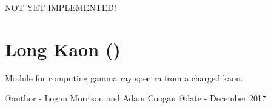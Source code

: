\documentclass[letterpaper,10pt,english]{sphinxmanual}
\begin{document}

\begin{fulllineitems}
\label{\detokenize{modules:hazma.charged_kaon.fsr}}
NOT YET IMPLEMENTED!

\end{fulllineitems}



\section{Long Kaon ()}
\label{\detokenize{modules:long-kaon-hazma-long-kaon}}\label{\detokenize{modules:module-hazma.charged_kaon}}
Module for computing gamma ray spectra from a charged kaon.

@author - Logan Morrison and Adam Coogan
@date - December 2017
\end{document}
